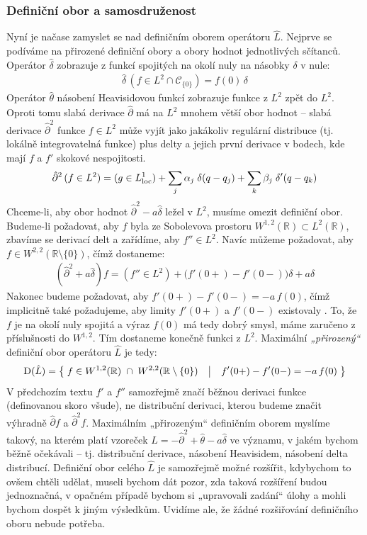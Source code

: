 \documentclass{article}
\newcommand{\R}{\mathbb{R}}
\begin{document}
\subsubsection*{Definiční obor a samosdruženost}
Nyní je načase zamyslet se nad definičním oborem operátoru $\hat L$. Nejprve se podíváme na přirozené definiční obory a obory hodnot jednotlivých sčítanců. Operátor $\hat\delta$ zobrazuje z funkcí spojitých na okolí nuly na násobky $\delta$ v nule:
\begin{align*}
    \hat\delta \, (f \in L^2 \cap \mathcal{C}_{\{0\}}) = f(0) \, \delta
\end{align*}
Operátor $\hat\theta$ násobení Heavisidovou funkcí zobrazuje funkce z $L^2$ zpět do $L^2$. Oproti tomu slabá derivace $\hat\partial$ má na $L^2$ mnohem větší obor hodnot – slabá derivace $\hat\partial^2$ funkce $f \in L^2$ může vyjít jako jakákoliv regulární distribuce (tj. lokálně integrovatelná funkce) plus delty a jejich první derivace v bodech, kde mají $f$ a $f'$ skokové nespojitosti.
\begin{align*}
    \hat\partial^2 \, (f \in L^2) =
    (g \in L^1_{\rm loc}) + \sum_j \alpha_j \; \delta(q - q_j) + \sum_k \beta_j \; \delta'(q - q_k)
\end{align*}
Chceme-li, aby obor hodnot $\hat\partial^2 - a \hat\delta$ ležel v $L^2$, musíme omezit definiční obor. Budeme-li požadovat, aby $f$ byla ze Sobolevova prostoru $W^{1,2}(\R) \subset L^2(\R)$, zbavíme se derivací delt a zařídíme, aby $f'' \in L^2$. Navíc můžeme požadovat, aby $f \in W^{2,2}(\R \setminus \{0\})$, čímž dostaneme:
\begin{align*}
    (\hat\partial^2 + a \hat\delta) f
    = (f'' \in L^2)
    + \big( f'(0+) - f'(0-) \big) \delta
    + a \delta
\end{align*}
Nakonec budeme požadovat, aby $f'(0+)-f'(0-) = -a \, f(0)$, čímž implicitně také požadujeme, aby limity $f'(0+)$ a $f'(0-)$ existovaly . To, že $f$ je na okolí nuly spojitá a výraz $f(0)$ má tedy dobrý smysl, máme zaručeno z příslušnosti do $W^{1,2}$. Tím dostaneme konečně funkci z $L^2$. Maximální \textit{„přirozený“} definiční obor operátoru $\hat L$ je tedy:
\begin{align*}
    {\rm D}(\hat L) = 
    \big\{\;
        f \in W^{1,2}(\R) \;\cap\; W^{2,2}(\R \setminus \{0\})
    \quad\big|\quad
        f'(0+) - f'(0-) = -a \, f(0)
    \;\big\}
\end{align*}
V předchozím textu $f'$ a $f''$ samozřejmě značí běžnou derivaci funkce (definovanou skoro všude), ne distribuční derivaci, kterou budeme značit výhradně $\hat\partial f$ a $\hat\partial^2 f$. Maximálním „přirozeným“ definičním oborem myslíme takový, na kterém platí vzoreček $\hat L = -\hat\partial^2 + \hat\theta - a\hat\delta$ ve významu, v jakém bychom běžně očekávali – tj. distribuční derivace, násobení Heavisidem, násobení delta distribucí. Definiční obor celého $\hat L$ je samozřejmě možné rozšířit, kdybychom to ovšem chtěli udělat, museli bychom dát pozor, zda taková rozšíření budou jednoznačná, v opačném případě bychom si „upravovali zadání“ úlohy a mohli bychom dospět k jiným výsledkům. Uvidíme ale, že žádné rozšiřování definičního oboru nebude potřeba.
\end{document}
